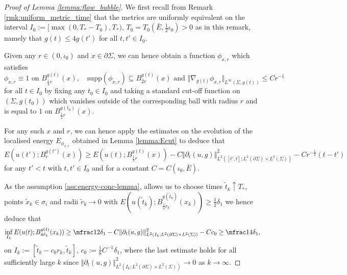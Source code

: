 \documentclass[10pt,reqno]{amsart}
\theoremstyle{plain}
\theoremstyle{definition}
\numberwithin{equation}{section}
\newcommand{\de}{\delta}
\newcommand{\si}{\sigma}
\newcommand{\Si}{\Sigma}
\newcommand{\upto}{\uparrow}
\newcommand{\norm}[1]{\Vert#1\Vert}
\newcommand{\beq}{\begin{equation}}
\newcommand{\eeq}{\end{equation}}
\newcommand{\half}{\frac{1}{2}}
\newcommand{\pt}{\partial_t}
\newcommand{\na}{\nabla}
\newcommand{\pSi}{{\partial \Sigma}}
\newcommand{\supp}{\text{supp}}
\newcommand{\p}{\partial} %
\newcommand{\subs}{\subseteq} %
\begin{document}
\begin{proof}[Proof of Lemma \ref{lemma:flow_bubble}]
    We first recall from Remark \ref{rmk:uniform_metric_time} that the metrics are uniformly equivalent on the interval $I_0:=[\max(0,T_*-T_0),T_*)$, $T_0=T_0(\bar E,\half \iota_0)>0$ as in this remark, namely that $g(t) \leq 4g(t')$ for all $t,t'\in I_0$.

    Given any $r\in (0,\iota_0)$ and $x\in \pSi$, we can hence obtain a function $\phi_{x,r}$ which satisfies
    \begin{equation*}
        \phi_{x,r} \equiv 1 \text{ on } B_{\frac14 r}^{g(t)}(x), \quad \supp(\phi_{x,r} ) \subs B_{2 r}^{g(t)}(x) \text{ and } \norm{\na_{g(t)}\phi_{x,r}}_{L^\infty(\Si,g(t))}\leq Cr^{-1} 
    \end{equation*}
    for all  $t\in I_0$ by fixing any $t_0\in I_0$ and taking a standard cut-off function on $(\Si,g(t_0))$ which vanishes outside of the corresponding ball with radius $r$ and is equal to $ 1$ on $B^{g(t_0)}_{\half r}(x)$. 

    For any such $x$ and $r$, we can hence apply the estimates on the evolution of the localised energy $E_{\phi_{x,r}}$ obtained in Lemma \ref{lemma:Ecut} to deduce that  
    \beq 
        E(u(t');B^{g(t')}_{r}(x)) \geq E(u(t);B^{g(t)}_{\frac14 r}(x))-C\norm{\pt(u,g)}_{L^2([t',t];L^2(\p\Si)\times L^2(\Si))}^2-Cr^{-\half} (t-t')
    \eeq
    for any $t'<t$ with $t,t'\in I_0$ and for a constant $C=C(\iota_0,\bar E)$.

    As the assumption \eqref{ass:energy-conc-lemma}, allows us to choose times $\tilde t_k\upto T_*$, points $\tilde x_k\in \si_i$ and radii $\tilde r_k\to 0$ with $ E(u(\tilde t_k);B^{g(\tilde t_k)}_{\frac14 \tilde r_k}( x_k))\geq \frac12\de_1$ we hence deduce that 
    $$\inf_{I_k} E(u( t);B^{g(t)}_{4 \tilde r_k}( x_k))\geq \mfrac12 \de_1 -C\norm{\pt (u,g)}_{L^2(I_k;L^2(\pSi)\times L^2(\Si))}^2-C c_0\geq \mfrac14 \de_1,$$
    on $I_k:=[\tilde t_k-c_0r_k,\tilde t_k]$, $c_0:=\frac18 C^{-1}\de_1$, where the last estimate holds for all sufficiently large $k$ since $\norm{\pt (u,g)}_{L^2(I_k;L^2(\pSi)\times L^2(\Si))}^2\to 0$ as $k\to \infty$.



\end{proof}
\end{document}
